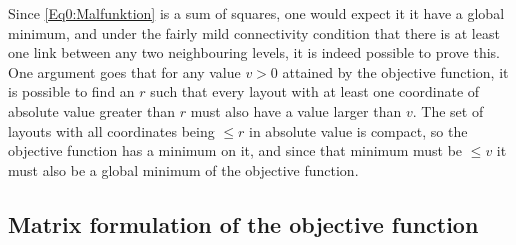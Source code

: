 \documentclass{article}
\theoremstyle{definition}
\begin{document}
Since \eqref{Eq0:Malfunktion} is a sum of squares, one would expect 
it it have a global minimum, and under the fairly mild connectivity 
condition that there is at least one link between any two 
neighbouring levels, it is indeed possible to prove this. One 
argument goes that for any value \(v > 0\) attained by the objective 
function, it is possible to find an $r$ such that every layout 
with at least one coordinate of absolute value greater than $r$ must 
also have a value larger than $v$. The set of layouts with all 
coordinates being $\leqslant r$ in absolute value is compact, so the 
objective function has a minimum on it, and since that minimum must 
be $\leqslant v$ it must also be a global minimum of the objective 
function.



\subsection{Matrix formulation of the objective function}
\end{document}
